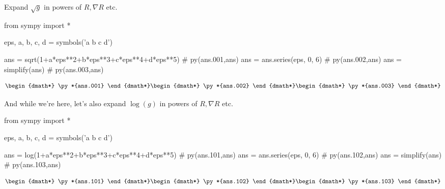 \documentclass[12pt]{pylatex}
\begin{document}
Expand $\sqrt{g}$ in powers of $R,\nabla R$ etc.

\begin{python}
   from sympy import *

   eps, a, b, c, d = symbols('\epsilon a b c d')

   ans = sqrt(1+a*eps**2+b*eps**3+c*eps**4+d*eps**5)   # py(ans.001,ans)
   ans = ans.series(eps, 0, 6)                         # py(ans.002,ans)
   ans = simplify(ans)                                 # py(ans.003,ans)

\end{python}

\begin{dgroup*}
   \begin{dmath*} \py*{ans.001} \end{dmath*}
   \begin{dmath*} \py*{ans.002} \end{dmath*}
   \begin{dmath*} \py*{ans.003} \end{dmath*}
\end{dgroup*}

And while we're here, let's also expand $\log(g)$ in powers of $R,\nabla R$ etc.

\begin{python}
   from sympy import *

   eps, a, b, c, d = symbols('\epsilon a b c d')

   ans = log(1+a*eps**2+b*eps**3+c*eps**4+d*eps**5)    # py(ans.101,ans)
   ans = ans.series(eps, 0, 6)                         # py(ans.102,ans)
   ans = simplify(ans)                                 # py(ans.103,ans)

\end{python}

\begin{dgroup*}
   \begin{dmath*} \py*{ans.101} \end{dmath*}
   \begin{dmath*} \py*{ans.102} \end{dmath*}
   \begin{dmath*} \py*{ans.103} \end{dmath*}
\end{dgroup*}
\end{document}
